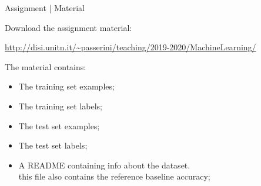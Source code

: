 \documentclass[10pt]{beamer}
\begin{document}
\begin{frame}{Assignment | Material}

Download the assignment material:

{\footnotesize \url{http://disi.unitn.it/~passerini/teaching/2019-2020/MachineLearning/}}

The material contains:
    \begin{itemize}
    \item The training set examples;
    \item The training set labels;
    \item The test set examples;
    \item The test set labels;
    \item A README containing info about the dataset. \\ this file also contains
          the reference baseline accuracy;
    \end{itemize}

\end{frame}


%
%
%
%
%

\end{document}
